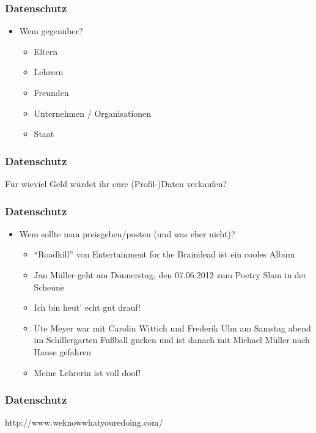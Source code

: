 \documentclass[12pt]{beamer}
\begin{document}
\begin{frame}
  \frametitle{Datenschutz}

  \begin{itemize}
    \item Wem gegenüber?
      \begin{itemize}
        \item<1-> Eltern
        \item<2-> Lehrern
        \item<3-> Freunden
        \item<4-> Unternehmen / Organisationen
        \item<2-> Staat
      \end{itemize}
  \end{itemize}
\end{frame}

\begin{frame}
  \frametitle{Datenschutz}

  \begin{center} \Large
   Für wieviel Geld würdet ihr eure (Profil-)Daten verkaufen?
  \end{center}
\end{frame}

\begin{frame}
  \frametitle{Datenschutz}

  \begin{itemize}
    \item Wem sollte man preisgeben/posten (und was eher nicht)?
      \begin{itemize}
        \item<1-> "`Roadkill"' von Entertainment for the Braindead ist ein cooles Album
        \item<2-> Jan Müller geht am Donnerstag, den 07.06.2012 zum Poetry Slam in der Scheune
        \item<3-> Ich bin heut' echt gut drauf!
        \item<4-> Ute Meyer war mit Carolin Wittich und Frederik Ulm am Samstag abend im Schillergarten Fußball gucken und ist danach mit Michael Müller nach Hause gefahren
        \item<5-> Meine Lehrerin ist voll doof!
      \end{itemize}
  \end{itemize}
\end{frame}

\begin{frame}
  \frametitle{Datenschutz}

  \begin{center} \Large
   http://www.weknowwhatyouredoing.com/
  \end{center}
\end{frame}
\end{document}
